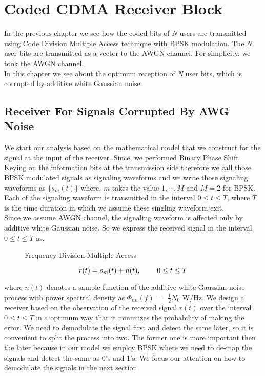 \chapter{Coded CDMA Receiver Block}
In the previous chapter we see how the coded bits of \textit{N} users are transmitted using Code Division Multiple Access technique with BPSK modulation. The \textit{N} user bits are transmitted as a vector to the AWGN channel. For simplicity, we took the AWGN channel. \\

In this chapter we see about the optimum reception of \textit{N} user bits, which is corrupted by additive white Gaussian noise.

\section{Receiver For Signals Corrupted By AWG Noise}

We start our analysis based on the mathematical model that we construct for the signal at the input of the receiver. Since, we performed Binary Phase Shift Keying on the information bits at the transmission side therefore we call those BPSK modulated signals as signaling waveforms and we write those signaling waveforms as $\{s_m(t)\}$ where, $m$ takes the value $1,\cdots , M$ and $M=2$ for BPSK. Each of the signaling waveform is transmitted in the interval $0\leq t \leq T$, where $T$ is the time duration in which we assume these singling waveform exit. \\

Since we assume AWGN channel, the signaling waveform is affected only by additive white Gaussian noise. So we express the received signal in the interval $0\leq t \leq T$ as,
\begin{figure}[htb]
  \centerline{  }
  \caption{Frequency Division Multiple Access}
\end{figure}
\begin{equation}
r(t) = s_m(t) + n(t), \hspace{8mm} 0\leq t \leq T
\end{equation}

where $n(t)$ denotes a sample function of the additive white Gaussian noise process with power spectral density as $\Phi_{nn}(f)\;=\;\frac{1}{2}N_0$ W/Hz. We design a receiver based on the observation of the received signal $r(t)$ over the interval $0\leq t \leq T$ in a optimum way that it minimizes the probability of making the error. We need to demodulate the signal first and detect the same later, so it is convenient to split the process into two. The former one is more important then the later because in our model we employ BPSK where we need to de-map the signals and detect the same as 0's and 1's. We focus our attention on how to demodulate the signals in the next section\\

